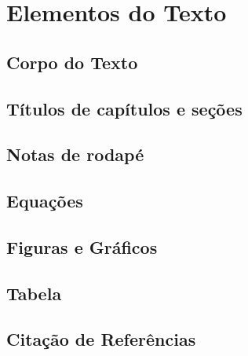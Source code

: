 \chapter[Elementos do Texto]{Elementos do Texto}

\section{Corpo do Texto}


\section{Títulos de capítulos e seções}


\section{Notas de rodapé}


\section{Equações}


\section{Figuras e Gráficos}

\section{Tabela}


\section{Citação de Referências}
